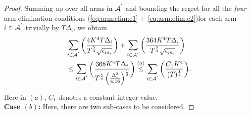\begin{proof}
Summing up over all arms in $\mathcal{A}^{'}$ and bounding the regret for all the \textit{four} arm elimination conditions (\ref{eq:arm:elim:c1} + \ref{eq:arm:elim:c2})for each arm $i\in \mathcal{A}^{'}$ trivially by $T\Delta_{i}$, we obtain
	\begin{align*}
&\sum_{i\in \mathcal{A}^{'}}\bigg(\dfrac{4 K^4 T\Delta_i}{T^{\frac{5}{4}}\sqrt{\epsilon_{m_i}}}\bigg) + \sum_{i\in \mathcal{A}^{'}}\bigg(\dfrac{364 K^4 T\Delta_i}{T^{\frac{5}{4}}\sqrt{\epsilon_{m_i}}}\bigg)\\
&\leq\sum_{i\in \mathcal{A}^{'}}\bigg(\dfrac{368 K^4 T\Delta_{i}}{T^{\frac{5}{4}}\left(\frac{\Delta_{i}^{2}}{4.16}\right)^{\frac{1}{2}}}\bigg)
\overset{(a)}{\leq} \sum_{i\in \mathcal{A}^{'}}\bigg(\dfrac{C_1 K^4}{(T)^{\frac{1}{4}}}\bigg).\\  
	\end{align*}

Here in $(a)$, $C_1$ denotes a constant integer value.\\


\textbf{Case $(b)$:} Here, there are two sub-cases to be considered.


\end{proof}

